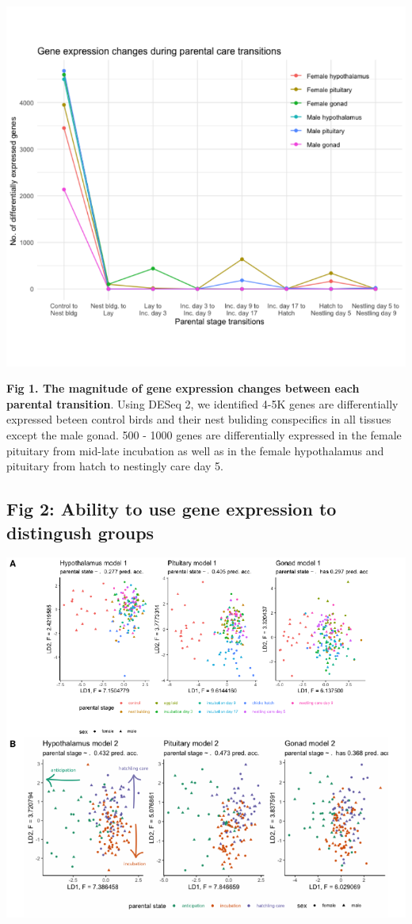 \documentclass[10pt,letterpaper]{article}
\begin{document}
\includegraphics{characterization_manuscript_files/figure-latex/unnamed-chunk-3-1.pdf}

\textbf{Fig 1. The magnitude of gene expression changes between each
parental transition}. Using DESeq 2, we identified 4-5K genes are
differentially expressed beteen control birds and their nest buliding
conspecifics in all tissues except the male gonad. 500 - 1000 genes are
differentially expressed in the female pituitary from mid-late
incubation as well as in the female hypothalamus and pituitary from
hatch to nestingly care day 5.

\hypertarget{fig-2-ability-to-use-gene-expression-to-distingush-groups}{%
\subsection{Fig 2: Ability to use gene expression to distingush
groups}\label{fig-2-ability-to-use-gene-expression-to-distingush-groups}}

\includegraphics{characterization_manuscript_files/figure-latex/unnamed-chunk-4-1.pdf}
\end{document}
